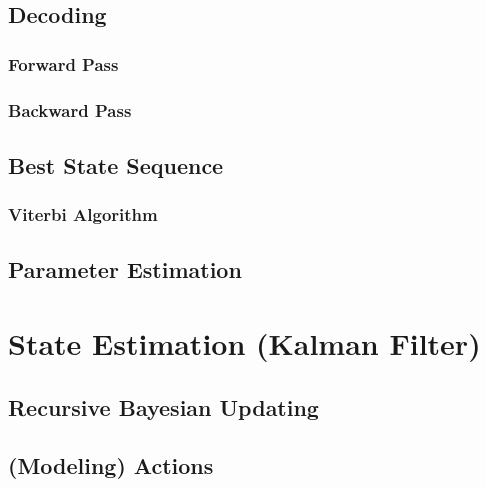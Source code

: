 		\subsection{Decoding} %

			\subsubsection{Forward Pass} %

			\subsubsection{Backward Pass} %

		\subsection{Best State Sequence} %

			\subsubsection{Viterbi Algorithm} %

		\subsection{Parameter Estimation} %

	\section{State Estimation (Kalman Filter)} %

		\subsection{Recursive Bayesian Updating} %

		\subsection{(Modeling) Actions} %

